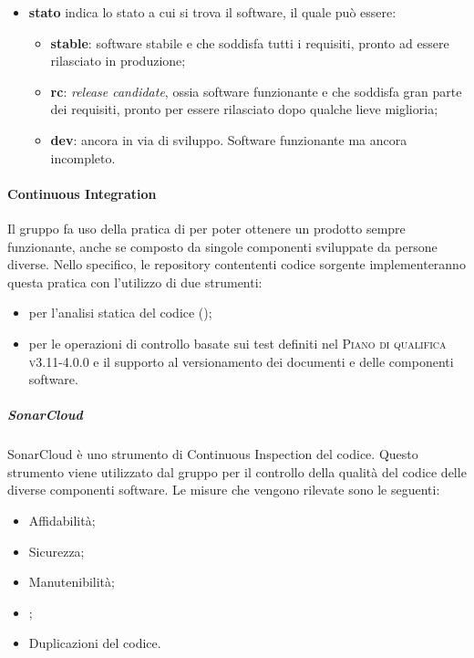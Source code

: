 \documentclass[../norme-di-progetto.tex]{subfiles}
\begin{document}
\begin{itemize}
\begin{itemize}
  \end{itemize}
  \item \textbf{stato} indica lo stato a cui si trova il software, il quale può essere:
  \begin{itemize}
    \item \textbf{stable}: software stabile e che soddisfa tutti i requisiti, pronto ad essere rilasciato in produzione;
    \item \textbf{rc}: \textit{release candidate}, ossia software funzionante e che soddisfa gran parte dei requisiti, pronto per essere rilasciato dopo qualche lieve miglioria;
    \item \textbf{dev}: ancora in via di sviluppo. Software funzionante ma ancora incompleto.
  \end{itemize}
\end{itemize}

\paragraph{Continuous Integration}
Il gruppo fa uso della pratica di  per poter ottenere un prodotto sempre funzionante, anche se composto da singole componenti sviluppate da persone diverse. Nello specifico, le repository contententi codice sorgente implementeranno questa pratica con l'utilizzo di due strumenti:
\begin{itemize}
  \item \textbf{} per l'analisi statica del codice ();
  \item \textbf{} per le operazioni di controllo basate sui test definiti nel \textsc{Piano di qualifica v3.11-4.0.0} e il supporto al versionamento dei documenti e delle componenti software.
\end{itemize}
\subparagraph{SonarCloud}
SonarCloud è uno strumento di Continuous Inspection del codice. Questo strumento viene utilizzato dal gruppo per il controllo della qualità del codice delle diverse componenti software. Le misure che vengono rilevate sono le seguenti:
\begin{itemize}
  \item Affidabilità;
  \item Sicurezza;
  \item Manutenibilità;
  \item {};
  \item Duplicazioni del codice.
\end{itemize}
\end{document}

